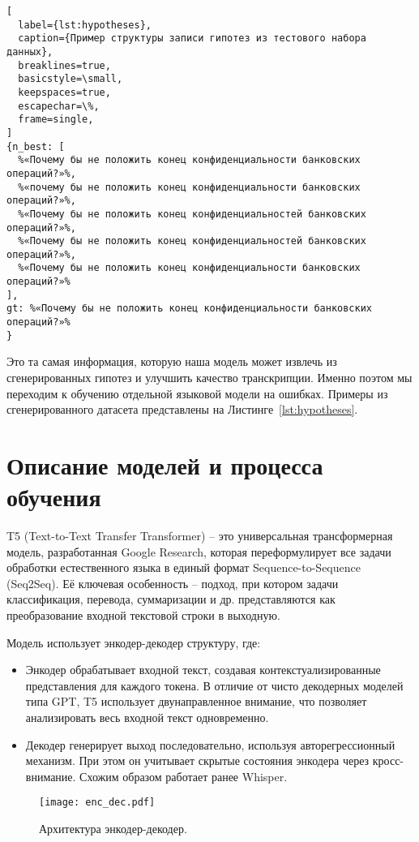 \begin{lstlisting}[
  label={lst:hypotheses},
  caption={Пример структуры записи гипотез из тестового набора данных},
  breaklines=true,
  basicstyle=\small,
  keepspaces=true,
  escapechar=\%,
  frame=single,
]
{n_best: [
  %«Почему бы не положить конец конфиденциальности банковских операций?»%,
  %«почему бы не положить конец конфиденциальности банковских операций?»%,
  %«Почему бы не положить конец конфиденциальностей банковских операций?»%,
  %«Почему бы не положить конец конфиденциальностей банковских операций?»%,
  %«Почему бы не положить конец конфиденциальности банковских операций?»%
],
gt: %«Почему бы не положить конец конфиденциальности банковских операций?»%
} 
\end{lstlisting}

Это та самая информация, которую наша модель может извлечь из сгенерированных гипотез и улучшить качество транскрипции.
Именно поэтом мы переходим к обучению отдельной языковой модели на ошибках.
Примеры из сгенерированного датасета представлены на Листинге~\ref{lst:hypotheses}.

\section{Описание моделей и процесса обучения}

T5 (Text-to-Text Transfer Transformer) -- это универсальная трансформерная модель, разработанная Google Research, которая переформулирует все задачи обработки естественного языка в единый формат Sequence-to-Sequence (Seq2Seq).
Её ключевая особенность -- подход, при котором задачи классификация, перевода, суммаризации и др. представляются как преобразование входной текстовой строки в выходную.

Модель использует энкодер-декодер структуру, где:
\begin{itemize}
  \item Энкодер обрабатывает входной текст, создавая контекстуализированные представления для каждого токена.
  В отличие от чисто декодерных моделей типа GPT, T5 использует двунаправленное внимание, что позволяет анализировать весь входной текст одновременно.
  \item Декодер генерирует выход последовательно, используя авторегрессионный механизм.
  При этом он учитывает скрытые состояния энкодера через кросс-внимание.
  Схожим образом работает ранее Whisper.
\end{itemize}

\begin{figure}[!t]
  \centering
  \texttt{[image: enc\_dec.pdf]}
  \caption{Архитектура энкодер-декодер.}
  \label{fig:enc_dec}
\end{figure}

